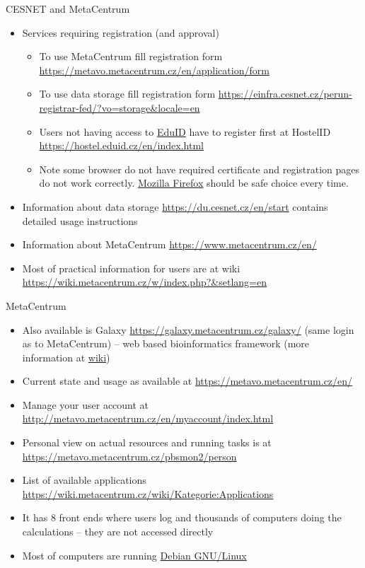 \documentclass[compress, ucs, xelatex, 11pt, xcolor=svgnames,
  hyperref={
    bookmarks=true,
    unicode=true,
    colorlinks=true,
    pdftitle={Linux, command line and MetaCentrum},
    plainpages=false,
    pdfauthor={Vojtech Zeisek},
    pdfsubject={Course about use of Linux command line, writing shell scripts and using MetaCentrum of CESNET},
    pdfcreator={XeLaTeX},
    pdfkeywords={Linux, GNU, BASH, shell, command line, MetaCentrum},
    linkcolor=Red,
    anchorcolor=Blue,
    citecolor=Purple,
    filecolor=DodgerBlue,
    menucolor=DarkOrchid,
    urlcolor=DeepSkyBlue,
    pdftex},
  url={hyphens, lowtilde} %
  ]{beamer}
\begin{document}
\begin{frame}[allowframebreaks]{CESNET and MetaCentrum}
\begin{itemize}
  \item Services requiring registration (and approval)
  \begin{itemize}
    \item To use MetaCentrum fill registration form \url{https://metavo.metacentrum.cz/en/application/form}
    \item To use data storage fill registration form \url{https://einfra.cesnet.cz/perun-registrar-fed/?vo=storage&locale=en}
    \item Users not having access to \href{https://www.eduid.cz/en/index}{EduID} have to register first at HostelID \url{https://hostel.eduid.cz/en/index.html}
    \item Note some browser do not have required certificate and registration pages do not work correctly. \href{https://www.mozilla.org/firefox/}{Mozilla Firefox} should be safe choice every time.
  \end{itemize}
  \item Information about data storage \url{https://du.cesnet.cz/en/start} contains detailed usage instructions
  \item Information about MetaCentrum \url{https://www.metacentrum.cz/en/}
  \item Most of practical information for users are at wiki \url{https://wiki.metacentrum.cz/w/index.php?&setlang=en}
\end{itemize}
\end{frame}

\begin{frame}{MetaCentrum}
\begin{itemize}
  \item Also available is Galaxy \url{https://galaxy.metacentrum.cz/galaxy/} (same login as to MetaCentrum) -- web based bioinformatics framework (more information at \href{https://wiki.metacentrum.cz/wiki/Galaxy_application}{wiki})
  \item Current state and usage as available at \url{https://metavo.metacentrum.cz/en/}
  \item Manage your user account at \url{http://metavo.metacentrum.cz/en/myaccount/index.html}
  \item Personal view on actual resources and running tasks is at \url{https://metavo.metacentrum.cz/pbsmon2/person}
  \item List of available applications \url{https://wiki.metacentrum.cz/wiki/Kategorie:Applications}
  \item It has 8 front ends where users log and thousands of computers doing the calculations -- they are not accessed directly
  \item Most of computers are running \href{https://www.debian.org/}{Debian GNU/Linux}
\end{itemize}
\end{frame}
\end{document}
